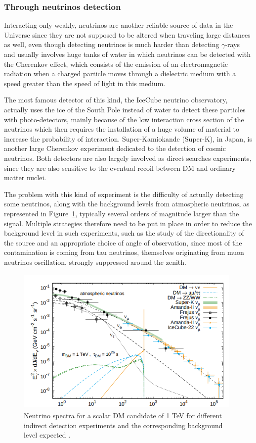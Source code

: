 \documentclass[a4paper, 10pt, openright]{report}
\begin{document}
\subsubsection*{Through neutrinos detection}
Interacting only weakly, neutrinos are another reliable source of data in the Universe since they are not supposed to be altered when traveling large distances as well, even though detecting neutrinos is much harder than detecting $\gamma$-rays and usually involves huge tanks of water in which neutrinos can be detected with the Cherenkov effect, which consists of the emission of an electromagnetic radiation when a charged particle moves through a dielectric medium with a speed greater than the speed of light in this medium.

The most famous detector of this kind, the IceCube neutrino observatory, actually uses the ice of the South Pole instead of water to detect these particles with photo-detectors, mainly because of the low interaction cross section of the neutrinos which then requires the installation of a huge volume of material to increase the probability of interaction. Super-Kamiokande (Super-K), in Japan, is another large Cherenkov experiment dedicated to the detection of cosmic neutrinos. Both detectors are also largely involved as direct searches experiments, since they are also sensitive to the eventual recoil between \ac{DM} and ordinary matter nuclei.

The problem with this kind of experiment is the difficulty of actually detecting some neutrinos, along with the background levels from atmospheric neutrinos, as represented in Figure~\ref{fig:BkgNeutrino}, typically several orders of magnitude larger than the signal. Multiple strategies therefore need to be put in place in order to reduce the background level in such experiments, such as the study of the directionality of the source and an appropriate choice of angle of observation, since most of the contamination is coming from tau neutrinos, themselves originating from muon neutrinos oscillation, strongly suppressed around the zenith.

\begin{figure}[htbp]
\begin{center}
\includegraphics[width=11cm, height=7.2cm]{figs/BkgNeutrino.png}
\caption{Neutrino spectra for a scalar \ac{DM} candidate of 1 TeV for different indirect detection experiments and the corresponding background level expected \cite{BkgNeutrino}.}
\label{fig:BkgNeutrino}
\end{center}
\end{figure}
\end{document}
